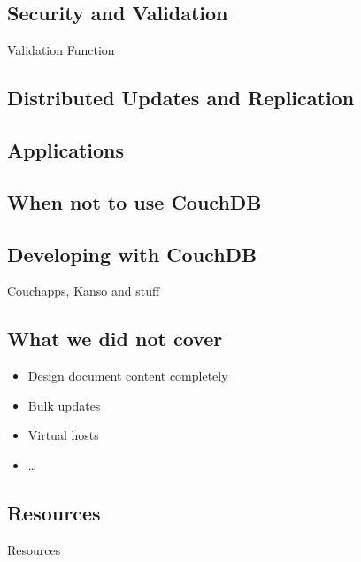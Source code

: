 \documentclass{beamer}
\begin{document}
\subsection{Security and Validation}
\begin{frame}
\end{frame}

\begin{frame}{Validation Function}
\end{frame}

\subsection{Distributed Updates and Replication}
\begin{frame}
\end{frame}

\subsection{Applications}
\begin{frame}
\end{frame}

\subsection{When not to use CouchDB}
\begin{frame}
\end{frame}

\subsection{Developing with CouchDB}
\begin{frame}{Couchapps, Kanso and stuff}
\end{frame}

\subsection{What we did not cover}
\begin{frame}
  \begin{itemize}
    \item Design document content completely
    \item Bulk updates
    \item Virtual hosts
    \item \ldots
  \end{itemize}
\end{frame}

\subsection{Resources}
\begin{frame}{Resources}
\end{frame}
\end{document}
